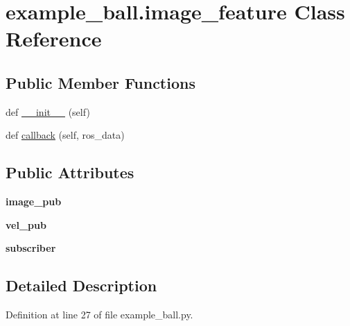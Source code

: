 \hypertarget{classexample__ball_1_1image__feature}{}\section{example\+\_\+ball.\+image\+\_\+feature Class Reference}
\label{classexample__ball_1_1image__feature}
\subsection*{Public Member Functions}
\begin{DoxyCompactItemize}
\item 
def \hyperlink{classexample__ball_1_1image__feature_a763c2126c33347904853ec4193273b8e}{\+\_\+\+\_\+init\+\_\+\+\_\+} (self)
\item 
def \hyperlink{classexample__ball_1_1image__feature_ab9332c62c4aafa56c99505cac8173e84}{callback} (self, ros\+\_\+data)
\end{DoxyCompactItemize}
\subsection*{Public Attributes}
\begin{DoxyCompactItemize}
\item 
{\bfseries image\+\_\+pub}\hypertarget{classexample__ball_1_1image__feature_a697c97b3884acc64a666669958d608e9}{}\label{classexample__ball_1_1image__feature_a697c97b3884acc64a666669958d608e9}

\item 
{\bfseries vel\+\_\+pub}\hypertarget{classexample__ball_1_1image__feature_ae5fac8ed2fec95438e6f9c7311a9eb33}{}\label{classexample__ball_1_1image__feature_ae5fac8ed2fec95438e6f9c7311a9eb33}

\item 
{\bfseries subscriber}\hypertarget{classexample__ball_1_1image__feature_a07d6638ec4f36520db54a45aed05bb64}{}\label{classexample__ball_1_1image__feature_a07d6638ec4f36520db54a45aed05bb64}

\end{DoxyCompactItemize}


\subsection{Detailed Description}


Definition at line 27 of file example\+\_\+ball.\+py.



